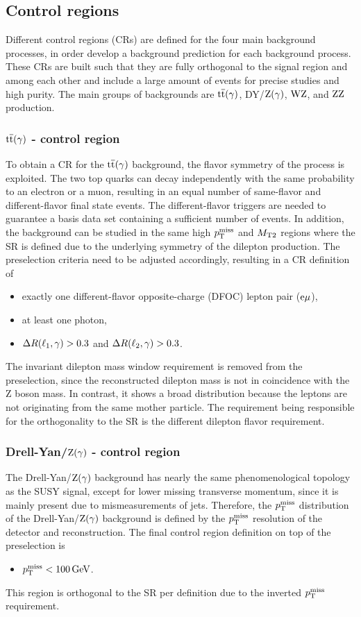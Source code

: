 \subsection{Control regions}\label{sec:CR}
Different control regions (CRs) are defined for the four main background processes, in order develop a background prediction for each background process. These CRs are built such that they are fully orthogonal to the signal region and among each other and include a large amount of events for precise studies and high purity. The main groups of backgrounds are ${\mathrm{t}\overline{\mathrm{t}}}(\gamma)$, DY/$\mathrm{Z}(\gamma)$, $\mathrm{W}\mathrm{Z}$, and $\mathrm{Z}\mathrm{Z}$ production.

\subsubsection*{${\mathrm{t}\overline{\mathrm{t}}}(\gamma)$ - control region}
To obtain a CR for the ${\mathrm{t}\overline{\mathrm{t}}}(\gamma)$ background, the flavor symmetry of the process is exploited. The two top quarks can decay independently with the same probability to an electron or a muon, resulting in an equal number of same-flavor and different-flavor final state events. The different-flavor triggers are needed to guarantee a basis data set containing a sufficient number of events. In addition, the background can be studied in the same high $p_{\mathrm{T}}^\text{miss}$ and $M_{\mathrm{T2}}$ regions where the SR is defined due to the underlying symmetry of the dilepton production. The preselection criteria need to be adjusted accordingly, resulting in a CR definition of
\begin{itemize}
 \item exactly one different-flavor opposite-charge (DFOC) lepton pair ($\mathrm{e}{\mu}$),
 \item at least one photon,
 \item $\Delta R(\ell_1,\gamma)>0.3$ and $\Delta R(\ell_2,\gamma)>0.3$.
\end{itemize}
The invariant dilepton mass window requirement is removed from the preselection, since the reconstructed dilepton mass is not in coincidence with the Z boson mass. In contrast, it shows a broad distribution because the leptons are not originating from the same mother particle. The requirement being responsible for the orthogonality to the SR is the different dilepton flavor requirement.
\subsubsection*{Drell-Yan/$\mathrm{Z}(\gamma)$ - control region}
The Drell-Yan/$\mathrm{Z}(\gamma)$ background has nearly the same phenomenological topology as the SUSY signal, except for lower missing transverse momentum, since it is mainly present due to mismeasurements of jets. Therefore, the $p_{\mathrm{T}}^\text{miss}$ distribution of the Drell-Yan/$\mathrm{Z}(\gamma)$ background is defined by the $p_{\mathrm{T}}^\text{miss}$ resolution of the detector and reconstruction. The final control region definition on top of the preselection is
\begin{itemize}
 \item $p_{\mathrm{T}}^\text{miss}<100\,\text{Ge\hspace{-.08em}V}$.
\end{itemize}
This region is orthogonal to the SR per definition due to the inverted $p_{\mathrm{T}}^\text{miss}$ requirement.
